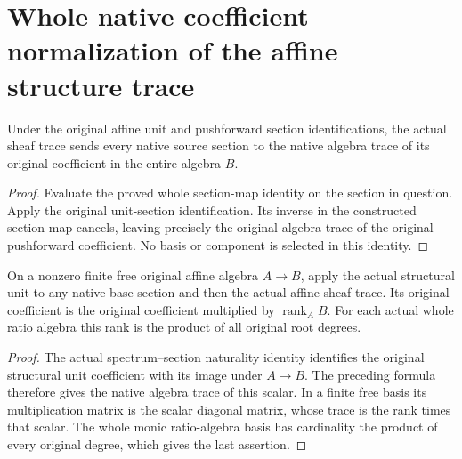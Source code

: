 \section{Whole native coefficient normalization of the affine structure trace}

\begin{lemma}
\label{lem:kn-structure-trace-affine-every-coefficient}
\leanok
Under the original affine unit and pushforward section identifications,
the actual sheaf trace sends every native source section to the native
algebra trace of its original coefficient in the entire algebra $B$.
\end{lemma}
\begin{proof}
Evaluate the proved whole section-map identity on the section in question.
Apply the original unit-section identification. Its inverse in the
constructed section map cancels, leaving precisely the original algebra
trace of the original pushforward coefficient. No basis or component is
selected in this identity.
\end{proof}

\begin{lemma}
\label{lem:kn-structure-trace-affine-unit-degree}
\leanok
On a nonzero finite free original affine algebra $A\to B$, apply the
actual structural unit to any native base section and then the actual
affine sheaf trace. Its original coefficient is the original coefficient
multiplied by $\operatorname{rank}_A B$. For each actual whole ratio
algebra this rank is the product of all original root degrees.
\end{lemma}
\begin{proof}
The actual spectrum--section naturality identity identifies the original
structural unit coefficient with its image under $A\to B$. The preceding
formula therefore gives the native algebra trace of this scalar. In a
finite free basis its multiplication matrix is the scalar diagonal
matrix, whose trace is the rank times that scalar. The whole monic
ratio-algebra basis has cardinality the product of every original degree,
which gives the last assertion.
\end{proof}
